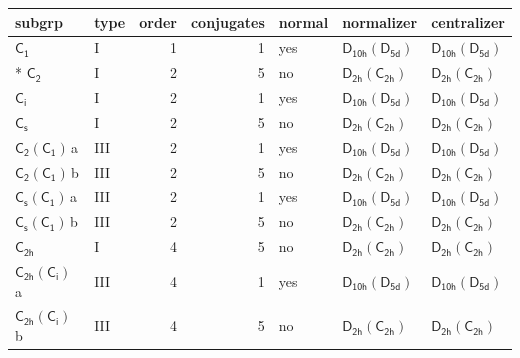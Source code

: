 \documentclass[10pt,a4paper]{article}
\numberwithin{equation}{section}
\newcommand{\grp}[1]{\mathsf{#1}}
\newcommand{\clsletter}[1]{\,{\scriptsize\color{black!55}#1}}
\begin{document}
{\small\begin{longtable}{@{}llrrlll@{}}\toprule
subgrp & type & order & conjugates & normal & normalizer & centralizer\\\midrule\endhead
\bottomrule\endfoot\endlastfoot
\href{../../../rotation/data/pdf/C1.pdf}{$\grp{C_{1}}$} & I & 1 & 1 & yes & \href{D10h-D5d.pdf}{$\grp{D_{10h}}(\grp{D_{5d}})$} & \href{D10h-D5d.pdf}{$\grp{D_{10h}}(\grp{D_{5d}})$}\\*
\href{../../../rotation/data/pdf/C2.pdf}{$\grp{C_{2}}$} & I & 2 & 5 & no & \href{D2h-C2h.pdf}{$\grp{D_{2h}}(\grp{C_{2h}})$} & \href{D2h-C2h.pdf}{$\grp{D_{2h}}(\grp{C_{2h}})$}\\
\href{../../../rotation/data/pdf/S2.pdf}{$\grp{C_{i}}$} & I & 2 & 1 & yes & \href{D10h-D5d.pdf}{$\grp{D_{10h}}(\grp{D_{5d}})$} & \href{D10h-D5d.pdf}{$\grp{D_{10h}}(\grp{D_{5d}})$}\\
\href{../../../rotation/data/pdf/C1v.pdf}{$\grp{C_{s}}$} & I & 2 & 5 & no & \href{D2h-C2h.pdf}{$\grp{D_{2h}}(\grp{C_{2h}})$} & \href{D2h-C2h.pdf}{$\grp{D_{2h}}(\grp{C_{2h}})$}\\
\href{C2-C1.pdf}{$\grp{C_{2}}(\grp{C_{1}})$}\clsletter{a} & III & 2 & 1 & yes & \href{D10h-D5d.pdf}{$\grp{D_{10h}}(\grp{D_{5d}})$} & \href{D10h-D5d.pdf}{$\grp{D_{10h}}(\grp{D_{5d}})$}\\
\href{C2-C1.pdf}{$\grp{C_{2}}(\grp{C_{1}})$}\clsletter{b} & III & 2 & 5 & no & \href{D2h-C2h.pdf}{$\grp{D_{2h}}(\grp{C_{2h}})$} & \href{D2h-C2h.pdf}{$\grp{D_{2h}}(\grp{C_{2h}})$}\\
\href{C1v-C1.pdf}{$\grp{C_{s}}(\grp{C_{1}})$}\clsletter{a} & III & 2 & 1 & yes & \href{D10h-D5d.pdf}{$\grp{D_{10h}}(\grp{D_{5d}})$} & \href{D10h-D5d.pdf}{$\grp{D_{10h}}(\grp{D_{5d}})$}\\
\href{C1v-C1.pdf}{$\grp{C_{s}}(\grp{C_{1}})$}\clsletter{b} & III & 2 & 5 & no & \href{D2h-C2h.pdf}{$\grp{D_{2h}}(\grp{C_{2h}})$} & \href{D2h-C2h.pdf}{$\grp{D_{2h}}(\grp{C_{2h}})$}\\
\href{../../../rotation/data/pdf/C2h.pdf}{$\grp{C_{2h}}$} & I & 4 & 5 & no & \href{D2h-C2h.pdf}{$\grp{D_{2h}}(\grp{C_{2h}})$} & \href{D2h-C2h.pdf}{$\grp{D_{2h}}(\grp{C_{2h}})$}\\
\href{C2h-S2.pdf}{$\grp{C_{2h}}(\grp{C_{i}})$}\clsletter{a} & III & 4 & 1 & yes & \href{D10h-D5d.pdf}{$\grp{D_{10h}}(\grp{D_{5d}})$} & \href{D10h-D5d.pdf}{$\grp{D_{10h}}(\grp{D_{5d}})$}\\
\href{C2h-S2.pdf}{$\grp{C_{2h}}(\grp{C_{i}})$}\clsletter{b} & III & 4 & 5 & no & \href{D2h-C2h.pdf}{$\grp{D_{2h}}(\grp{C_{2h}})$} & \href{D2h-C2h.pdf}{$\grp{D_{2h}}(\grp{C_{2h}})$}\\

\end{longtable}}
\end{document}

